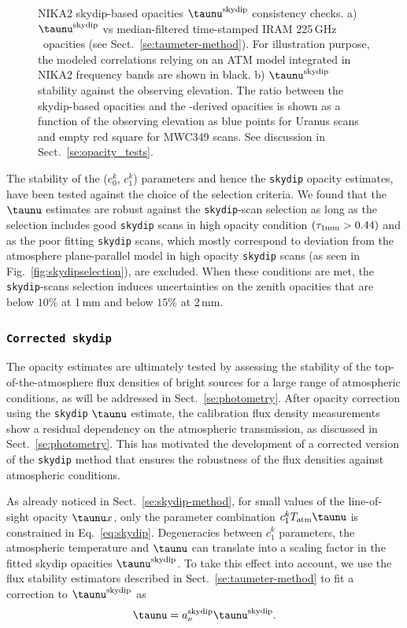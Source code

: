 \begin{figure}[!thbp]
\begin{center}
   \caption[]{NIKA2
     skydip-based opacities $\taunu^{\rm{skydip}}$ consistency checks.
     a) $\taunu^{\rm{skydip}}$ vs median-filtered
    time-stamped IRAM 225\,GHz \taumeter\ opacities (see
    Sect.~\ref{se:taumeter-method}).
    For illustration purpose, the modeled correlations relying on an ATM model integrated in
    NIKA2 frequency bands are shown in black. b) $\taunu^{\rm{skydip}}$ stability against the observing
    elevation. The ratio between the skydip-based opacities and the
    \taumeter-derived opacities is shown as a function of the observing
    elevation as blue points for Uranus scans and empty red square for
    MWC349 scans. See discussion in Sect.~\ref{se:opacity_tests}. } 
\label{fig:skydip-to-taumeter-correl}
\end{center}
\end{figure}
%
The stability of the ($c_0^k$, $c_1^k$) parameters and hence the
{\tt skydip} opacity estimates, have been tested against the
choice of the selection criteria. We found that the $\taunu$
estimates are robust against the {\tt skydip}-scan selection as long as the
selection includes good {\tt skydip} scans in high opacity condition
$(\tau_{1\rm{mm}} > 0.44)$ and as the poor
fitting {\tt skydip} scans, which mostly correspond to deviation from the
atmosphere plane-parallel model in high opacity {\tt skydip} scans (as seen in
Fig.~\ref{fig:skydipselection}), are excluded. When these conditions
are met, the {\tt skydip}-scans selection induces uncertainties on the zenith
opacities that are below $10\%$ at 1\,mm and below $15\%$ at 2\,mm.  


\subsubsection{{\tt Corrected skydip}}
\label{se:corrected-skydip}
The opacity estimates are ultimately tested by assessing the
stability of the top-of-the-atmosphere flux densities of bright sources for a large
range of atmospheric conditions, as will be addressed in
Sect.~\ref{se:photometry}. After opacity correction using the
{\tt skydip} $\taunu$ estimate, the calibration flux density
measurements show a residual dependency on the atmospheric
transmission, as discussed in Sect.~\ref{se:photometry}. This has
motivated the development of a corrected version of the {\tt skydip}
method that ensures the robustness of the flux densities against
atmospheric conditions.

{\lp As already noticed in Sect.~\ref{se:skydip-method}, for small values of the
line-of-sight opacity $\taunu x$, only the parameter combination
$c_1^k T_{\rm{atm}}\taunu$ is constrained in
Eq.~\ref{eq:skydip}. Degeneracies between $c_1^k$ parameters, the
atmospheric temperature and $\taunu$ can translate into a
scaling factor in the fitted skydip opacities
$\taunu^{\rm{skydip}}$. To take this effect into account, }  
we use the flux stability estimators described in
Sect.~\ref{se:taumeter-method} to fit a correction to $\taunu^{\rm{skydip}}$ as
\begin{equation}  
  \taunu =  a_\nu^{\rm{skydip}}\taunu^{\rm{skydip}}.
  \label{eq:corrected_skydip}
\end{equation}

